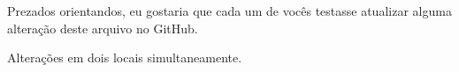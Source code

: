 \documentclass{article}
\begin{document}
Prezados orientandos,
eu gostaria que cada um de vocês testasse atualizar alguma alteração deste arquivo no GitHub.

Alterações em dois locais simultaneamente.
\end{document}
